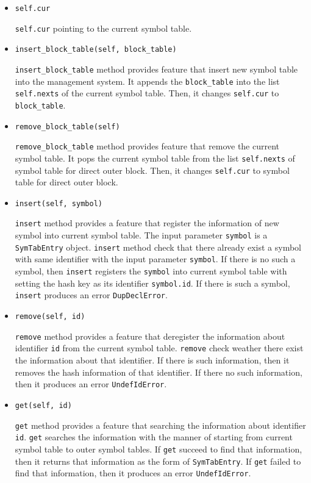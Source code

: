 \documentclass{article}
\newcommand{\code}[1]{\texttt{#1}}
\begin{document}
	\begin{itemize}
		\item \code{self.cur}
		
		\code{self.cur} pointing to the current symbol table.
		
		\item \code{insert\_block\_table(self, block\_table)}
		
		\code{insert\_block\_table} method provides feature that insert new symbol table into the management system. It appends the \code{block\_table} into the list \code{self.nexts} of the current symbol table. Then, it changes \code{self.cur} to \code{block\_table}.
		
		\item \code{remove\_block\_table(self)}
		
		\code{remove\_block\_table} method provides feature that remove the current symbol table. It pops the current symbol table from the list \code{self.nexts} of symbol table for direct outer block. Then, it changes \code{self.cur} to symbol table for direct outer block. 
		
		\item \code{insert(self, symbol)}
		
		\code{insert} method provides a feature that register the information of new symbol into current symbol table. The input parameter \code{symbol} is a \code{SymTabEntry} object. \code{insert} method check that there already exist a symbol with same identifier with the input parameter \code{symbol}. If there is no such a symbol, then \code{insert} registers the \code{symbol} into current symbol table with setting the hash key as its identifier \code{symbol.id}. If there is such a symbol, \code{insert} produces an error \code{DupDeclError}.
		
		\item \code{remove(self, id)}
		
		\code{remove} method provides a feature that deregister the information about identifier \code{id} from the current symbol table. \code{remove} check weather there exist the information about that identifier. If there is such information, then it removes the hash information of that identifier. If there no such information, then it produces an error \code{UndefIdError}.
		
		\item \code{get(self, id)}
		
		\code{get} method provides a feature that searching the information about identifier \code{id}. \code{get} searches the information with the manner of starting from current symbol table to outer symbol tables. If \code{get} succeed to find that information, then it returns that information as the form of \code{SymTabEntry}. If \code{get} failed to find that information, then it produces an error \code{UndefIdError}.
	\end{itemize}
	
\end{document}
